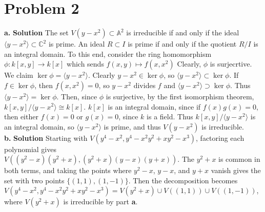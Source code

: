 \documentclass{article}
\begin{document}
\section{Problem 2}
\textbf{a. } \textbf{Solution } The set $V(y - x^2) \subset \mathbb{A}^2$ is irreducible if and only if the ideal $\langle y - x^2 \rangle \subset \mathbb{C}^2$ is prime. 
An ideal $ R \subset I$ is prime if and only if the quotient $R / I$ is an integral domain. To this end, consider the ring homomorphism $\phi : k[x, y] \to k[x]$ which sends $f(x, y) \mapsto f(x, x^2)$
Clearly, $\phi$ is surjecrtive. We claim $\ker \phi = \langle y -x^2 \rangle$. Clearly $y - x^2 \in \ker \phi$, so $\langle y - x^2 \rangle \subset \ker \phi$. 
If $f \in \ker \phi$, then $f(x, x^2) = 0$, so $y - x^2$ divides $f$ and $\langle y - x^2 \rangle \supset \ker \phi$. Thus $\langle y - x^2 \rangle = \ker \phi$. Then, since $\phi$ is surjective,
by the first isomorphism theorem, $k[x, y] / \langle y - x^2 \rangle \cong k[x]$. $k[x]$ is an integral domain, since if $f(x)g(x) = 0$, then either $f(x) = 0$ or $g(x) = 0$, since $k$ is a field. 
Thus $k[x, y] / \langle y - x^2 \rangle$ is an integral domain, so $\langle y - x^2 \rangle$ is prime, and thus $V(y - x^2)$ is irreducible. \\
\textbf{b. } \textbf{Solution } Starting with $V(y^4 - x^2, y^4 - x^2y^2 + xy^2 -x^3)$, factoring each polynomial gives \\ $V \left(  (y^2-x)(y^2+x), (y^2+x)(y-x)(y+x)   \right)$. 
The $y^2 + x$ is common in both terms, and taking the points where $y^2 - x$, $y-x$, and $y+x$ vanish gives the set with two points $\{(1, 1), (1, -1)\}$. Then the decomposition becomes
$ V(y^4 - x^2, y^4 - x^2y^2 + xy^2 -x^3) = V(y^2 + x) \cup V((1, 1)) \cup V((1, -1)) $, where $V(y^2 + x)$ is irreducible by part \textbf{a}. 
\end{document}

